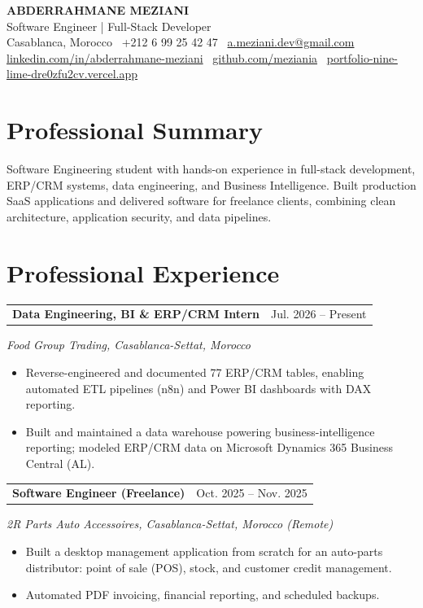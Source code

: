 \documentclass[11pt,a4paper]{article}
\makeatletter
\newcommand{\entry}[2]{%
  \noindent
  \begin{tabularx}{\textwidth}{@{}X r@{}}
    \textbf{#1} & {\small #2} \\
  \end{tabularx}\par\vspace{1pt}
}
\newcommand{\subentry}[1]{{\small\color{subtext}\itshape #1}\par\vspace{2pt}}
\newcommand{\items}[1]{%
  \begin{itemize}[leftmargin=14pt, itemsep=1.5pt, topsep=2pt, parsep=0pt]
    #1
  \end{itemize}
}
\makeatother
\begin{document}
\begin{center}
  {\LARGE \bfseries ABDERRAHMANE MEZIANI}\\[5pt]
  Software Engineer | Full-Stack Developer\\[7pt]
  Casablanca, Morocco \textbar\ +212 6 99 25 42 47 \textbar\ \href{mailto:a.meziani.dev@gmail.com}{a.meziani.dev@gmail.com}\\
  \href{https://www.linkedin.com/in/abderrahmane-meziani-929b8a26b/}{linkedin.com/in/abderrahmane-meziani} \textbar\
  \href{https://github.com/meziania}{github.com/meziania} \textbar\
  \href{https://portfolio-nine-lime-dre0zfu2cv.vercel.app/}{portfolio-nine-lime-dre0zfu2cv.vercel.app}
\end{center}

\section{Professional Summary}
Software Engineering student with hands-on experience in full-stack development, ERP/CRM systems, data engineering, and Business Intelligence. Built production SaaS applications and delivered software for freelance clients, combining clean architecture, application security, and data pipelines.

\section{Professional Experience}

\entry{Data Engineering, BI \& ERP/CRM Intern}{Jul. 2026 -- Present}
\subentry{Food Group Trading, Casablanca-Settat, Morocco}
\items{
  \item Reverse-engineered and documented 77 ERP/CRM tables, enabling automated ETL pipelines (n8n) and Power BI dashboards with DAX reporting.
  \item Built and maintained a data warehouse powering business-intelligence reporting; modeled ERP/CRM data on Microsoft Dynamics 365 Business Central (AL).
}

\entry{Software Engineer (Freelance)}{Oct. 2025 -- Nov. 2025}
\subentry{2R Parts Auto Accessoires, Casablanca-Settat, Morocco (Remote)}
\items{
  \item Built a desktop management application from scratch for an auto-parts distributor: point of sale (POS), stock, and customer credit management.
  \item Automated PDF invoicing, financial reporting, and scheduled backups.
}
\end{document}
